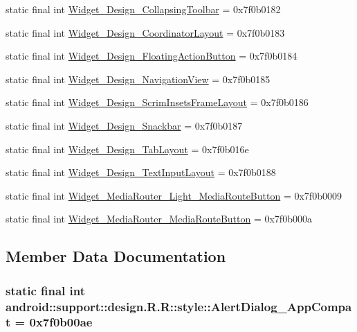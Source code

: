 \begin{CompactItemize}
\item 
static final int \hyperlink{classandroid_1_1support_1_1design_1_1_r_1_1style_ac400ae0d17b021431ad40dc7fa61338}{Widget\_\-Design\_\-CollapsingToolbar} = 0x7f0b0182
\item 
static final int \hyperlink{classandroid_1_1support_1_1design_1_1_r_1_1style_8fabb5685a903ddfd9a6a92e9e5da9c7}{Widget\_\-Design\_\-CoordinatorLayout} = 0x7f0b0183
\item 
static final int \hyperlink{classandroid_1_1support_1_1design_1_1_r_1_1style_82335909831ade81596cd8b2602557e0}{Widget\_\-Design\_\-FloatingActionButton} = 0x7f0b0184
\item 
static final int \hyperlink{classandroid_1_1support_1_1design_1_1_r_1_1style_684de218f752f945e12b979708c2aead}{Widget\_\-Design\_\-NavigationView} = 0x7f0b0185
\item 
static final int \hyperlink{classandroid_1_1support_1_1design_1_1_r_1_1style_6cfff3e646ff00e8724538cfefa52b26}{Widget\_\-Design\_\-ScrimInsetsFrameLayout} = 0x7f0b0186
\item 
static final int \hyperlink{classandroid_1_1support_1_1design_1_1_r_1_1style_01d6f779880f233215b039b3b63b46b6}{Widget\_\-Design\_\-Snackbar} = 0x7f0b0187
\item 
static final int \hyperlink{classandroid_1_1support_1_1design_1_1_r_1_1style_22a31d40f2f84aa03f5bbf2aa1277f91}{Widget\_\-Design\_\-TabLayout} = 0x7f0b016e
\item 
static final int \hyperlink{classandroid_1_1support_1_1design_1_1_r_1_1style_7dbf63ff290e14e9e0613bd2b7e70294}{Widget\_\-Design\_\-TextInputLayout} = 0x7f0b0188
\item 
static final int \hyperlink{classandroid_1_1support_1_1design_1_1_r_1_1style_9853646df842e3694d3297eec2758c13}{Widget\_\-MediaRouter\_\-Light\_\-MediaRouteButton} = 0x7f0b0009
\item 
static final int \hyperlink{classandroid_1_1support_1_1design_1_1_r_1_1style_e7e1cef42c3f8201d49e921cf010151a}{Widget\_\-MediaRouter\_\-MediaRouteButton} = 0x7f0b000a
\end{CompactItemize}


\subsection{Member Data Documentation}
\hypertarget{classandroid_1_1support_1_1design_1_1_r_1_1style_5da40a69e338da6699ba1ed42460f1d4}{
\subsubsection[{AlertDialog\_\-AppCompat}]{\setlength{\rightskip}{0pt plus 5cm}static final int android::support::design.R.R::style::AlertDialog\_\-AppCompat = 0x7f0b00ae}}
\label{classandroid_1_1support_1_1design_1_1_r_1_1style_5da40a69e338da6699ba1ed42460f1d4}


